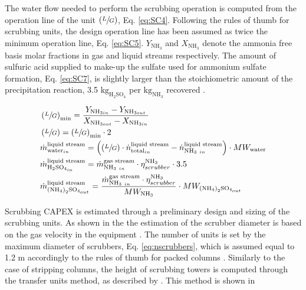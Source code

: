 \begin{refsection}[referencesCh6]
The water flow needed to perform the scrubbing operation is computed from the operation line of the unit $\left(\sfrac{L}{G}\right)$, Eq. \ref{eq:SC4}. Following the rules of thumb for scrubbing units, the design operation line has been assumed as twice the minimum operation line, Eq. \ref{eq:SC5}. $Y_{\text{NH}_3}$ and $X_{\text{NH}_3}$ denote the ammonia free basis molar fractions in gas and liquid streams respectively. The amount of sulfuric acid supplied to make-up the sulfate used for ammonium sulfate formation, Eq. \ref{eq:SC7}, is slightly larger than the stoichiometric amount of the precipitation reaction, 3.5 $\text{kg}_{\text{H}_2 \text{SO}_4}$ per ${\text{kg}_{\text{NH}_3}}$ recovered \citep{bolzonella2018nutrients}.

\begin{align}
& \left(\sfrac{L}{G}\right)_{\text{min}}= \frac{Y_{\text{NH}_{3 in}} - Y_{\text{NH}_{3 out}}}{X_{\text{NH}_{3 out}} - X_{\text{NH}_{3 in}}} \label{eq:SC4} 
\\
& \left(\sfrac{L}{G}\right)= \left(\sfrac{L}{G}\right)_{\text{min}} \cdot 2 \label{eq:SC5} 
\\
& \dot{m}_{\text{water}_{in}}^{\text{liquid stream}} = \left(\left(\sfrac{L}{G}\right) \cdot \dot{n}_{\text{total}_{in}}^{\text{liquid stream}} - \dot{n}_{\text{NH}_{3 \ in}}^{\text{liquid stream}}\right) \cdot MW_{\text{water}} \label{eq:SC6} 
\\
& \dot{m}_{\text{H}_2 \text{SO}_{4_{in}}}^{\text{liquid stream}} = \dot{m}_{\text{NH}_{3 \ in}}^{\text{gas stream}} \cdot \eta_{scrubber}^{\text{NH}_3} \cdot 3.5 \label{eq:SC7} 
\\
& \dot{m}_{\left(\text{NH}_4\right)_2 \text{SO}_{4_{out}}}^{\text{liquid stream}} = \frac{\dot{m}_{\text{NH}_{3 \ in}}^{\text{gas stream}} \cdot \eta_{scrubber}^{\text{NH}_3}}{MW_{\text{NH}_3}} \cdot MW_{\left(\text{NH}_4\right)_2 \text{SO}_{4_{out}}} \label{eq:SC8} 
\end{align}

Scrubbing CAPEX is estimated through a preliminary design and sizing of the scrubbing units. As shown in the {} the estimation of the scrubber diameter is based on the gas velocity in the equipment \citep{melse2005}. The number of units is set by the maximum diameter of scrubbers, Eq. \ref{eq:nscrubbers}, which is assumed equal to 1.2 m accordingly to the rules of thumb for packed columns \citep{Branan}. Similarly to the case of stripping columns, the height of scrubbing towers is computed through the transfer units method, as described by \citet{couper2005chemical}. This method is shown in {}


\end{refsection}
